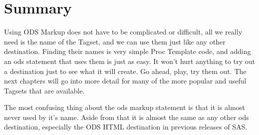 \section{Summary}
Using ODS Markup does not have to be complicated or difficult, all we really
need is the name of the Tagset, and we can use them just like any other destination.
Finding their names is very simple Proc Template code, and adding an ods statement that uses them is
just as easy.  It won't hurt anything to try out a destination just to see what it
will create.  Go ahead, play, try them out.  The next chapters will go into more 
detail for many of the more popular and useful Tagsets that are available.

The most confusing thing about the ods markup statement is that it
is almost never used by it's name.  Aside from that it is almost
the same as any other ods destination, especially the ODS HTML
destination in previous releases of SAS.

